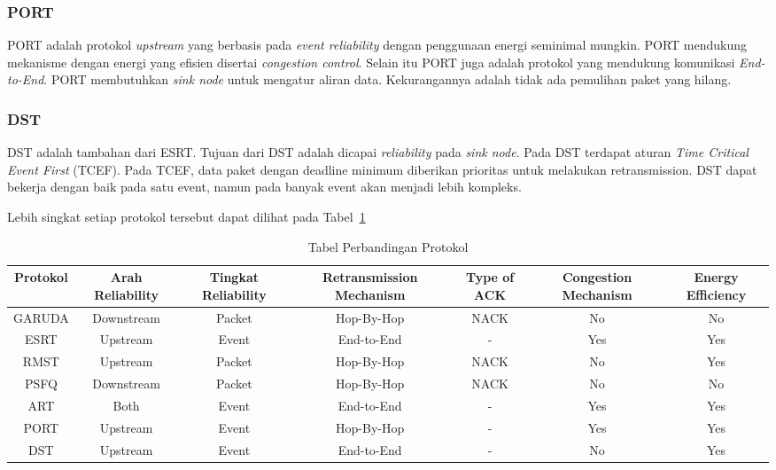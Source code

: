 \subsubsection{PORT}
PORT adalah protokol \textit{upstream} yang berbasis pada \textit{event reliability} dengan penggunaan energi seminimal mungkin. PORT mendukung mekanisme dengan energi yang efisien disertai \textit{congestion control}. Selain itu PORT juga adalah protokol yang mendukung komunikasi \textit{End-to-End}. PORT membutuhkan \textit{sink node} untuk mengatur aliran data. Kekurangannya adalah tidak ada pemulihan paket yang hilang.

\subsubsection{DST}
DST adalah tambahan dari ESRT. Tujuan dari DST adalah dicapai \textit{reliability} pada \textit{sink node}. Pada DST terdapat aturan \textit{Time Critical Event First} (TCEF). Pada TCEF, data paket dengan deadline minimum diberikan prioritas untuk melakukan retransmission. DST dapat bekerja dengan baik pada satu event, namun pada banyak event akan menjadi lebih kompleks.

Lebih singkat setiap protokol tersebut dapat dilihat pada Tabel~\ref{tab:protokol_reliable}
\begin{table}[H] %
	\centering 
	\caption{Tabel Perbandingan Protokol}
	\label{tab:protokol_reliable}
	\begin{tabular}{c|c|c|c|c|c|c}
		\toprule
		Protokol & Arah Reliability & Tingkat Reliability & Retransmission Mechanism & Type of ACK & Congestion Mechanism & Energy Efficiency\\

		\midrule
		GARUDA & Downstream & Packet & Hop-By-Hop & NACK & No & No\\
		ESRT & Upstream & Event & End-to-End & - & Yes & Yes\\
		RMST & Upstream & Packet & Hop-By-Hop & NACK & No & Yes\\
		PSFQ & Downstream & Packet & Hop-By-Hop & NACK & No & No\\
		ART & Both & Event & End-to-End	 & - & Yes & Yes\\
		PORT & Upstream & Event & Hop-By-Hop & - & Yes & Yes\\
		DST & Upstream & Event & End-to-End & - & No & Yes\\

		\bottomrule
		
	\end{tabular} 
\end{table}



